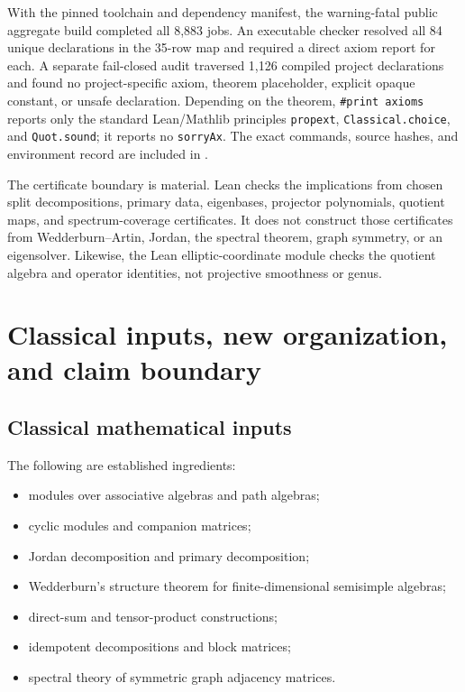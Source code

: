 \documentclass[11pt]{article}
\theoremstyle{definition}
\theoremstyle{remark}
\begin{document}
With the pinned toolchain and dependency manifest, the warning-fatal public aggregate build completed all 8,883 jobs. An executable checker resolved all 84 unique declarations in the 35-row map and required a direct axiom report for each. A separate fail-closed audit traversed 1,126 compiled project declarations and found no project-specific axiom, theorem placeholder, explicit opaque constant, or unsafe declaration. Depending on the theorem, \texttt{\#print axioms} reports only the standard Lean/Mathlib principles \texttt{propext}, \texttt{Classical.choice}, and \texttt{Quot.sound}; it reports no \texttt{sorryAx}. The exact commands, source hashes, and environment record are included in .

The certificate boundary is material. Lean checks the implications from chosen split decompositions, primary data, eigenbases, projector polynomials, quotient maps, and spectrum-coverage certificates. It does not construct those certificates from Wedderburn--Artin, Jordan, the spectral theorem, graph symmetry, or an eigensolver. Likewise, the Lean elliptic-coordinate module checks the quotient algebra and operator identities, not projective smoothness or genus.

\section{Classical inputs, new organization, and claim boundary}

\subsection{Classical mathematical inputs}

The following are established ingredients:
\begin{itemize}
\item modules over associative algebras and path algebras;
\item cyclic modules and companion matrices;
\item Jordan decomposition and primary decomposition;
\item Wedderburn's structure theorem for finite-dimensional semisimple algebras;
\item direct-sum and tensor-product constructions;
\item idempotent decompositions and block matrices;
\item spectral theory of symmetric graph adjacency matrices.
\end{itemize}
\end{document}
